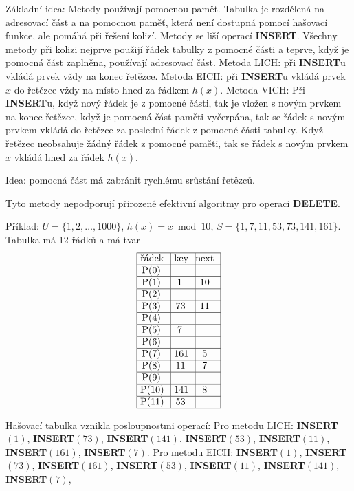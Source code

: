 \documentclass[a4paper,12pt]{article}
\begin{document}
Základní idea: Metody používají pomocnou paměť. 
Tabulka je rozdělená na adresovací část a na pomocnou 
paměť, která není dostupná pomocí hašovací funkce, 
ale pomáhá při řešení kolizí. Metody se liší operací 
{\bf INSERT}. Všechny metody při kolizi nejprve použijí řádek 
tabulky z pomocné části a teprve, když je pomocná část 
zaplněna, používají adresovací část.\newline 
Metoda LICH: při {\bf INSERT}u vkládá prvek vždy na konec 
ře\-těz\-ce.\newline 
Metoda EICH: při {\bf INSERT}u vkládá prvek $x$ do řetězce vždy 
na místo hned za řádkem $h(x)$.\newline 
Metoda VICH: Při {\bf INSERT}u, když nový řádek je z 
pomocné části, tak je vložen s novým prvkem na konec 
řetězce, když je pomocná část paměti vyčer\-pá\-na, tak se 
řádek s novým prvkem vkládá do řetězce za posled\-ní 
řádek z pomocné části tabulky. Když řetězec neobsahuje 
žádný řádek z pomocné paměti, tak se řádek s novým  prvkem $
x$ vkládá hned za řádek $h(x)$. 

Idea: pomocná část má zabránit rychlému 
srůstání řetězců.

Tyto metody nepodporují přirozené efektivní algoritmy 
pro ope\-raci {\bf DELETE}.

Příklad: $U=\{1,2,\dots,1000\}$, $h(x)=x\bmod10$,\newline 
$S=\{1,7,11,53,73,141,161\}$. Tabulka má 12 řádků a 
má tvar
$$\vtop{\offinterlineskip\halign {\strut\vrule\ # & \vrule\ # & \vrule \hfil # \hfil \vrule\cr\noalign{\hrule}řádek & key & next \hfil \cr\noalign{\hrule}P(0) & &\hfill \cr\noalign{\hrule}P(1) & 1 & 10 \cr\noalign{\hrule}P(2) & &\hfill \cr\noalign{\hrule}P(3) & 73 & 11 \cr\noalign{\hrule}P(4) &  &\hfill \cr\noalign{\hrule}P(5) & 7 & \hfill \cr\noalign{\hrule}P(6) & &\hfill \cr\noalign{\hrule}P(7) & 161 & 5 \cr\noalign{\hrule}P(8) & 11 & 7 \cr\noalign{\hrule}P(9) & &\hfill \cr\noalign{\hrule}\noalign{\hrule}P(10) & 141 & 8 \cr\noalign{\hrule}P(11) & 53 & \cr\noalign{\hrule}}}$$

Hašovací tabulka vznikla posloupnostmi operací:\newline 
Pro metodu LICH:\newline 
{\bf INSERT$(1)$}, {\bf INSERT$(73)$}, {\bf INSERT$(141)$}, 
{\bf INSERT$(53)$}, {\bf INSERT$(11)$},\newline 
{\bf INSERT$(161)$}, {\bf INSERT$(7)$}.\newline 
Pro metodu EICH:\newline 
{\bf INSERT$(1)$}, {\bf INSERT$(73)$}, {\bf INSERT$(161)$}, 
{\bf INSERT$(53)$}, {\bf INSERT$(11)$},\newline 
{\bf INSERT$(141)$}, {\bf INSERT$(7)$},
\end{document}

